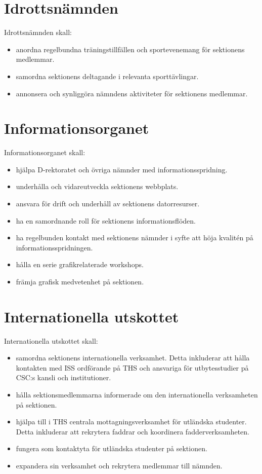 \documentclass[a4paper]{article}
\begin{document}
\section{Idrottsnämnden}
Idrottsnämnden skall:
\begin{itemize}
\item anordna regelbundna träningstillfällen och sportevenemang för sektionens medlemmar.
\item samordna sektionens deltagande i relevanta sporttävlingar.
\item annonsera och synliggöra nämndens aktiviteter för sektionens medlemmar.
\end{itemize}

\section{Informationsorganet}
Informationsorganet skall:
\begin{itemize}
\item hjälpa D-rektoratet och övriga nämnder med informationsspridning.
\item underhålla och vidareutveckla sektionens webbplats.
\item ansvara för drift och underhåll av sektionens datorresurser.
\item ha en samordnande roll för sektionens informationsflöden.
\item ha regelbunden kontakt med sektionens nämnder i syfte att höja kvalitén på informationsspridningen.
\item hålla en serie grafikrelaterade workshops.
\item främja grafisk medvetenhet på sektionen.
\end{itemize}

\section{Internationella utskottet}
Internationella utskottet skall:
\begin{itemize}
\item samordna sektionens internationella verksamhet. Detta inkluderar att hålla kontakten med ISS ordförande på THS och ansvariga för utbytesstudier på CSC:s kansli och institutioner.
\item hålla sektionsmedlemmarna informerade om den internationella verksamheten på sektionen.
\item hjälpa till i THS centrala mottagningsverksamhet för utländska studenter. Detta inkluderar att rekrytera faddrar och koordinera fadderverksamheten.
\item fungera som kontaktyta för utländska studenter på sektionen.
\item expandera sin verksamhet och rekrytera medlemmar till nämnden.
\end{itemize}
\end{document}

